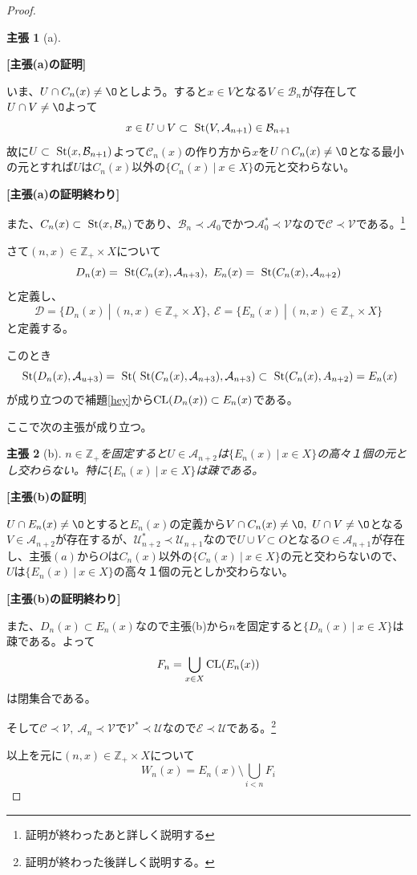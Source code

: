 \documentclass[leqno]{jsarticle}
\newtheorem*{claim}{主張}
\newcommand{\zz}{\mathbb{Z}}
\newcommand{\cl}{\text{{\rm CL}} }
\newcommand{\s}{\text{  {\rm St}} }
\newcommand{\uu}{\mathcal{U}}
\newcommand{\vv}{\mathcal{V}}
\newcommand{\A}{\mathcal{A}}
\newcommand{\B}{\mathcal{B}}
\newcommand{\C}{\mathcal{C}}
\newcommand{\D}{\mathcal{D}}
\newcommand{\E}{\mathcal{E}}
\newcommand{\pr}{\prec}
\newcommand{\zp}{\zz_{+}}
\begin{document}
\begin{proof}
\begin{claim}[a]
\end{claim}
{\bf [主張(a)の証明]}\par
いま、$U\cap C_n(x)\neq\O$としよう。すると$x\in V$となる$V\in \B_n$が存在して$U\cap V\neq\O$よって
\[
x\in U\cup V\subset \s(V,\A_{n+1})\in \B_{n+1}
\]
故に$U\subset \s(x,\B_{n+1})$よって$\C_n(x)$の作り方から$x$を$U\cap C_n(x)\neq\O$となる最小の元とすれば$U$は$C_n(x)$以外の$\{C_n(x)\ |\ x\in X\}$の元と交わらない。\par
{\bf [主張(a)の証明終わり]}\par
また、$C_n(x)\subset \s(x,\B_{n})$であり、$\B_n\pr \A_0$でかつ$\A_0^{*}\pr \vv$なので$\C\pr\vv$である。\footnote{証明が終わったあと詳しく説明する}\par
さて$(n,x)\in \zp\times X$について
\[
D_n(x)=\s(C_n(x),\A_{n+3}),\ E_n(x)=\s(C_n(x),\A_{n+2})
\]
と定義し、
\[
\D=\{D_n(x)\ |\ (n,x)\in \zp\times X\},\ \E=\{E_n(x)\ |\ (n,x)\in \zp\times X\}
\]
と定義する。\par
このとき
\[
\s(D_n(x),\A_{u+3})=\s(\s(C_n(x),\A_{n+3}),\A_{n+3})\subset \s(C_n(x),A_{n+2})=E_n(x)
\]
が成り立つので補題\ref{hey}から$\cl(D_n(x))\subset E_n(x)$である。\par
ここで次の主張が成り立つ。
\begin{claim}[b]
$n\in \zp$を固定すると$U\in \A_{n+2}$は$\{E_n(x)\ |\ x\in X\}$の高々１個の元とし交わらない。特に$\{E_n(x)\ |\ x\in X\}$は疎である。
\end{claim}
{\bf [主張(b)の証明]}\par
$U\cap E_n(x)\neq\O$とすると$E_n(x)$の定義から$V\cap C_n(x)\neq\O,\ U\cap V\neq\O$となる$V\in \A_{n+2}$が存在するが、$\uu_{n+2}^{*}\pr \uu_{n+1}$なので$U\cup V\subset O$となる$O\in \A_{n+1}$が存在し、主張$(a)$から$O$は$C_n(x)$以外の$\{C_n(x)\ |\ x\in X\}$の元と交わらないので、$U$は$\{E_n(x)\ |\ x\in X\}$の高々１個の元としか交わらない。\par
{\bf [主張(b)の証明終わり]}\par
また、$D_n(x)\subset E_n(x)$なので主張(b)から$n$を固定すると$\{D_n(x)\ |\ x\in X\}$は疎である。よって
\[
F_n=\bigcup_{x\in X}\cl(E_n(x))
\]
は閉集合である。\par
そして$\C\pr \vv,\ \A_n\pr \vv$で$\vv^{*}\pr\uu$なので$\mathcal{E}\pr \uu$である。\footnote{証明が終わった後詳しく説明する。}\par
以上を元に$(n,x)\in \zp\times X$について
\[
W_n(x)=E_n(x)\setminus \bigcup_{i<n}F_i
\]
\end{proof}
\end{document}
